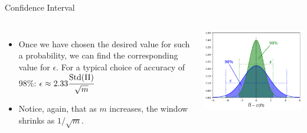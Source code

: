 \documentclass{beamer}
\begin{document}
\begin{frame}{Confidence Interval}
  \begin{columns}
    \begin{itemize}
    \item Once we have chosen the desired value for such a probability, we can find the corresponding value for $\epsilon$. For a typical choice of accuracy of 98\%: $\epsilon \approx 2.33 \cfrac{\text{Std}(\Pi)}{\sqrt{m}}$
    \item Notice, again, that as $m$ increases, the window shrinks as $1/\sqrt{m}$.
    \end{itemize}
    \includegraphics[width=0.9\linewidth]{confidence_interval}
  \end{columns}
\end{frame}
\end{document}
